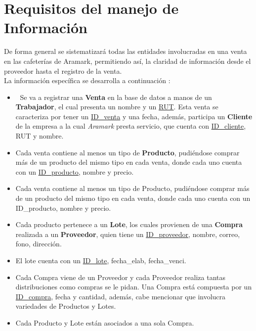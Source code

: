 \documentclass[12pt]{article}
\begin{document}
	\section{Requisitos del manejo de Informaci\'on}
	De forma general se sistematizar\'a todas las entidades involucradas en una venta en las cafeter\'ias de Aramark, permitiendo as\'i, la claridad de informaci\'on desde el proveedor hasta el registro de la venta.\\
	La informaci\'on espec\'ifica se desarrolla a continuaci\'on :
	\begin{itemize}
	\item 
	Se va a registrar una \textbf{Venta} en la base de datos a manos de un \textbf{Trabajador}, el cual presenta un nombre y un \underline{RUT}. Esta venta se caracteriza por tener un \underline{ID\_venta} y una fecha, adem\'as, participa un \textbf{Cliente} de la empresa a la cual \textit{Aramark} presta servicio, que cuenta con \underline{ID\_cliente}, RUT y nombre.
	\item Cada venta contiene al menos un tipo de \textbf{Producto}, pudi\'endose comprar m\'as de un producto del mismo tipo en cada venta, donde cada uno cuenta con un \underline{ID\_producto}, nombre y precio. 
	\item Cada venta contiene al menos un tipo de Producto, pudi\'endose comprar m\'as de un producto del mismo tipo en cada venta, donde cada uno cuenta con un ID\_producto, nombre y precio.
	\item Cada producto pertenece a un \textbf{Lote}, los cuales provienen  de una \textbf{Compra} realizada a un  \textbf{Proveedor}, quien tiene un \underline{ID\_proveedor}, nombre, correo, fono, direcci\'on.
	\item El lote cuenta con un \underline{ID\_lote}, fecha\_elab, fecha\_venci.
	\item Cada Compra viene de un Proveedor y cada Proveedor realiza tantas distribuciones como compras se le pidan. Una Compra est\'a compuesta por un \underline{ID\_compra}, fecha y cantidad, adem\'as, cabe mencionar que involucra variedades de Productos y Lotes.
	\item Cada Producto y Lote est\'an asociados a una sola Compra.
\end{itemize}
	\newpage
\end{document}
